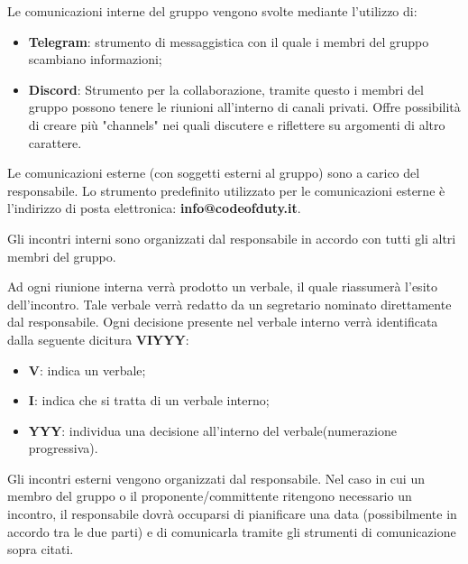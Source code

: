 				Le comunicazioni interne del gruppo vengono svolte mediante l'utilizzo di:
				\begin{itemize}
					\item \textbf{Telegram}: strumento di messaggistica con il quale i membri del gruppo scambiano informazioni;
					\item \textbf{Discord}: Strumento per la collaborazione, tramite questo i membri del gruppo possono tenere le riunioni all'interno di canali privati. Offre possibilità di creare più "channels" nei quali discutere e riflettere su argomenti di altro carattere.
				\end{itemize}  
				
				Le comunicazioni esterne (con soggetti esterni al gruppo) sono a carico del responsabile. Lo strumento predefinito utilizzato per le comunicazioni esterne è l'indirizzo di posta elettronica: \textbf{info@codeofduty.it}.
				
			
			
				Gli incontri interni sono organizzati dal responsabile in accordo con tutti gli altri membri del gruppo. 
				
				Ad ogni riunione interna verrà prodotto un verbale, il quale riassumerà l'esito dell'incontro. Tale verbale verrà redatto da un segretario nominato direttamente dal responsabile. Ogni decisione presente nel verbale interno verrà identificata dalla seguente dicitura \textbf{VIYYY}:
				\begin{itemize}
					\item \textbf{V}: indica un verbale;
					\item\textbf{I}: indica che si tratta di un verbale interno;
					\item\textbf{YYY}: individua una decisione all'interno del verbale(numerazione progressiva).
				\end{itemize}
			
				Gli incontri esterni vengono organizzati dal responsabile. Nel caso in cui un membro del gruppo o il proponente/committente ritengono necessario un incontro, il responsabile dovrà occuparsi di pianificare una data (possibilmente in accordo tra le due parti) e di comunicarla tramite gli strumenti di comunicazione sopra citati.
				
